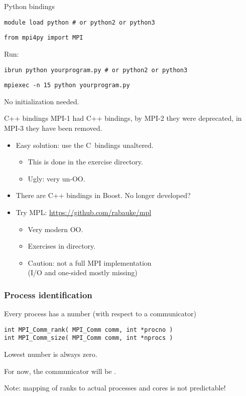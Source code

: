 \begin{frame}[containsverbatim]{Python bindings}
\begin{verbatim}
module load python # or python2 or python3
\end{verbatim}
\begin{verbatim}
from mpi4py import MPI
\end{verbatim}
Run:
\begin{tacc}
\begin{verbatim}
ibrun python yourprogram.py # or python2 or python3
\end{verbatim}
\end{tacc}
\begin{verbatim}
mpiexec -n 15 python yourprogram.py
\end{verbatim}
No initialization needed.
\end{frame}

\begin{frame}[containsverbatim]{C++ bindings}
  MPI-1 had C++ bindings, by MPI-2 they were deprecated, in MPI-3 they have been removed.
  \begin{itemize}
  \item Easy solution: use the C~bindings unaltered.
    \begin{itemize}
    \item This is done in the  exercise directory.
    \item Ugly: very un-OO.
    \end{itemize}
  \item There are C++ bindings in Boost. No longer developed?
  \item Try MPL: \url{https://github.com/rabauke/mpl}
    \begin{itemize}
    \item Very modern OO.
    \item Exercises in  directory.
    \item Caution: not a full MPI implementation\\
      (I/O and one-sided mostly missing)
    \end{itemize}
  \end{itemize}
\end{frame}

\begin{exerciseframe}[hello]
  
\end{exerciseframe}

\begin{frame}[containsverbatim]\frametitle{Process identification}
Every process has a number (with respect to a communicator)
\lstset{language=C}
\begin{lstlisting}
int MPI_Comm_rank( MPI_Comm comm, int *procno )
int MPI_Comm_size( MPI_Comm comm, int *nprocs )
\end{lstlisting}
Lowest number is always zero.

For now, the communicator will be .

Note: mapping of ranks to actual processes and cores is not predictable!
\end{frame}

